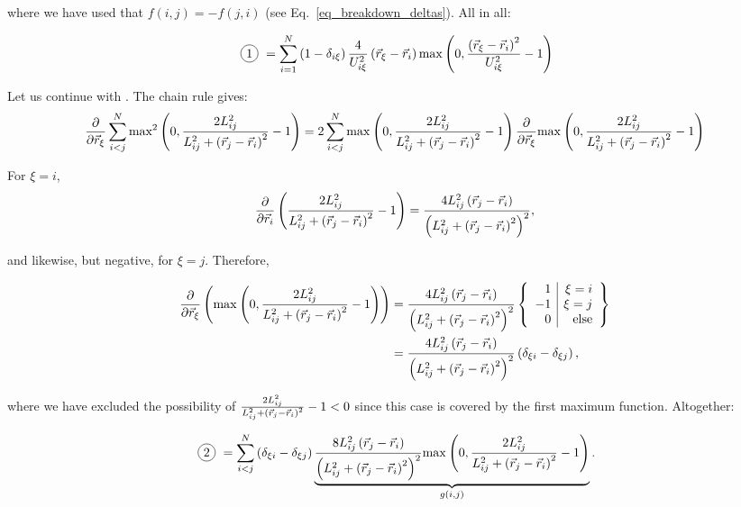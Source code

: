 \documentclass[a4paper]{article}
\newcommand*\circled[1]{
  \tikz[baseline=(char.base)]{
    \node[shape=circle,draw,inner sep=2pt] (char) {#1};
  }
}
\begin{document}
where we have used that $f(i, j) = -f(j, i)$ (see Eq.~\ref{eq_breakdown_deltas}).
All in all:

\begin{equation}
  \text{\circled{1}}
  = \iNSum \left(1 - \delta_{i\xi}\right) \frac{4}{U_{i\xi}^{2}}
    \posVecDiff{\xi}{i}\max\left(0,
      \frac{\posVecDiff{\xi}{i}^{2}}{U_{i\xi}^{2}}-1
    \right)
\end{equation}

Let us continue with \circled{2}. The chain rule gives:
\begin{equation}
  \frac{\partial}{\partial\vec{r}_{\xi}} \sum_{i < j}^{N} \textrm{max}^{2} \left(0, \frac{2 L_{ij}^{2}}{L_{ij}^{2} + \left(\vec{r}_{j}-\vec{r}_{i}\right)^{2}}-1\right)
  = 2 \sum_{i < j}^{N} \textrm{max}^{} \left(0, \frac{2 L_{ij}^{2}}{L_{ij}^{2} + \left(\vec{r}_{j}-\vec{r}_{i}\right)^{2}}-1\right) \frac{\partial}{\partial\vec{r}_{\xi}}
    \textrm{max}^{} \left(0, \frac{2 L_{ij}^{2}}{L_{ij}^{2} + \left(\vec{r}_{j}-\vec{r}_{i}\right)^{2}}-1\right)
\end{equation}

For $\xi = i$,
\begin{equation}
  \frac{\partial}{\partial\vec{r}_{i}} \left( \frac{2 L_{ij}^{2}}{L_{ij}^{2} + \left(\vec{r}_{j}-\vec{r}_{i}\right)^{2}}-1 \right)
  = \frac{4 L_{ij}^{2} \left(\vec{r}_{j}-\vec{r}_{i}\right)}
    {\left(L_{ij}^{2} + \left(\vec{r}_{j}-\vec{r}_{i}\right)^2\right)^2},
\end{equation}

and likewise, but negative, for $\xi = j$. Therefore,

\begin{align*}
  \frac{\partial}{\partial\vec{r}_{\xi}} \left( \textrm{max}^{} \left(0, \frac{2 L_{ij}^{2}}{L_{ij}^{2} + \left(\vec{r}_{j}-\vec{r}_{i}\right)^{2}}-1\right) \right)
  &=\frac{
    4 L_{ij}^{2} \left(\vec{r}_{j}-\vec{r}_{i}\right)
  }{
    \left(
      L_{ij}^{2} + \left(\vec{r}_{j}-\vec{r}_{i}\right)^2
    \right)^2
  } \left\{ \begin{array}{ r | r}
    1 & \xi = i\\
    - 1 & \xi = j\\
    0 & \textrm{else}
  \end{array} \right\}\\
  &= \frac{
    4 L_{ij}^{2} \left(\vec{r}_{j}-\vec{r}_{i}\right)
  }{
    \left(
      L_{ij}^{2} + \left(\vec{r}_{j}-\vec{r}_{i}\right)^2
    \right)^2
  } \left(
    \delta_{\xi i} - \delta_{\xi j} 
  \right),
\end{align*}

where we have excluded the possibility of $\frac{2 L_{ij}^{2}}{L_{ij}^{2} + \left(\vec{r}_{j}-\vec{r}_{i}\right)^{2}}-1 < 0$
since this case is covered by the first maximum function. Altogether:

\begin{equation}\label{eq_breakdown_deltas_second}
  \text{\circled{2}}
  = \ijNSum \left(
    \delta_{\xi i} - \delta_{\xi j} 
  \right) \underbrace{
    \frac{
      8 L_{ij}^{2} \posVecDiff{j}{i}
    }{
      \left(
        L_{ij}^{2} + \posVecDiff{j}{i}^2
      \right)^2
    } \distanceErrorSecondTerm{}
  }_{g(i, j)}.
\end{equation}
\end{document}

